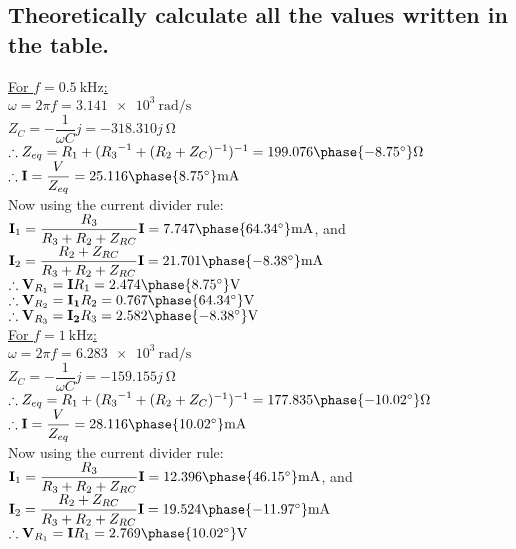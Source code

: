 \documentclass[12pt]{article}
\begin{document}
\begin{large}
	\subsection{Theoretically calculate all the values written in the table.}
	\underline{For $ f = \SI{0.5}{\kilo\hertz} $:}\\
	$ \omega = 2 \pi f = \SI{3.141e3}{\radian\per\s} $\\
	$ Z_C = - \dfrac{1}{\omega C} j = -318.310 j \SI{}{\ohm} $\\
	$ \therefore Z_{eq} = R_1 + ({R_3}^{-1} + (R_2 + Z_C)^{-1})^{-1} = 199.076\phase{-8.75^\circ} \SI{}{\ohm} $\\
	$ \therefore \mathbf{I} = \dfrac{V}{Z_{eq}} = 25.116\phase{8.75^\circ} \SI{}{\milli\A} $\\
	Now using the current divider rule:\\
	$ \mathbf{I}_1 = \dfrac{R_3}{R_3 + R_2 + Z_{RC}} \mathbf{I} = 7.747\phase{64.34^\circ} \SI{}{\milli\A} $, and\\
	$ \mathbf{I}_2 = \dfrac{R_2 + Z_{RC}}{R_3 + R_2 + Z_{RC}} \mathbf{I} = 21.701\phase{-8.38^\circ} \SI{}{\milli\A} $\\
	$ \therefore \mathbf{V}_{R_1} = \mathbf{I} R_1 = 2.474\phase{8.75^\circ} \SI{}{\V} $\\
	$ \therefore \mathbf{V}_{R_2} = \mathbf{I_1} R_2 = 0.767\phase{64.34^\circ} \SI{}{\V} $\\
	$ \therefore \mathbf{V}_{R_3} = \mathbf{I_2} R_3 = 2.582\phase{-8.38^\circ} \SI{}{\V} $\\[20pt]
	\underline{For $ f = \SI{1}{\kilo\hertz} $:}\\
	$ \omega = 2 \pi f = \SI{6.283e3}{\radian\per\s} $\\
	$ Z_C = - \dfrac{1}{\omega C} j = -159.155 j \SI{}{\ohm} $\\
	$ \therefore Z_{eq} = R_1 + ({R_3}^{-1} + (R_2 + Z_C)^{-1})^{-1} = 177.835\phase{-10.02^\circ} \SI{}{\ohm} $\\
	$ \therefore \mathbf{I} = \dfrac{V}{Z_{eq}} = 28.116\phase{10.02^\circ} \SI{}{\milli\A} $\\
	Now using the current divider rule:\\
	$ \mathbf{I}_1 = \dfrac{R_3}{R_3 + R_2 + Z_{RC}} \mathbf{I} = 12.396\phase{46.15^\circ} \SI{}{\milli\A} $, and\\
	$ \mathbf{I}_2 = \dfrac{R_2 + Z_{RC}}{R_3 + R_2 + Z_{RC}} \mathbf{I} = 19.524\phase{-11.97^\circ} \SI{}{\milli\A} $\\
	$ \therefore \mathbf{V}_{R_1} = \mathbf{I} R_1 = 2.769\phase{10.02^\circ} \SI{}{\V} $\\

\end{large}
\end{document}
